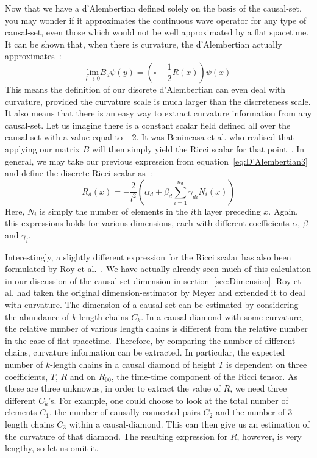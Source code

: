 \documentclass[a4paper,12pt]{article}
\numberwithin{equation}{section}
\begin{document}
Now that we have a d'Alembertian defined solely on the basis of the causal-set, you may wonder if it approximates the continuous wave operator for any type of causal-set, even those which would not be well approximated by a flat spacetime. It can be shown that, when there is curvature, the d'Alembertian actually approximates~\cite{Benincasa2010}:
\begin{equation}
\label{eq:Ricci scalar}
\underset{l\rightarrow 0}{\text{lim}} B_{d} \psi(y)=\left( \square-\frac{1}{2}R(x)\right) \psi(x)
\end{equation}
This means the definition of our discrete d'Alembertian can even deal with curvature, provided the curvature scale is much larger than the discreteness scale. It also means that there is an easy way to extract curvature information from any causal-set. Let us imagine there is a constant scalar field defined all over the causal-set with a value equal to $-2$. It was Benincasa et al. who realised that applying our matrix $B$ will then simply yield the Ricci scalar for that point~\cite{Benincasa2010}. In general, we may take our previous expression from equation~\ref{eq:D'Alembertian3} and define the discrete Ricci scalar as~\cite{Dowker2013}:
\begin{equation}
\label{eq:Ricci scalar2}
R_d (x)=-\frac{2}{l^2}\left(\alpha_d +\beta_d \sum_{i=1}^{n_d} \gamma_{d i} N_i(x)\right)
\end{equation}
Here, $N_i$ is simply the number of elements in the $i$th layer preceding $x$. Again, this expressions holds for various dimensions, each with different coefficients $\alpha$, $\beta$ and $\gamma_i$.

Interestingly, a slightly different expression for the Ricci scalar has also been formulated by Roy et al.~\cite{Roy2012}.
We have actually already seen much of this calculation in our discussion of the causal-set dimension in section~\ref{sec:Dimension}. Roy et al. had taken the original dimension-estimator by Meyer and extended it to deal with curvature. The dimension of a causal-set can be estimated by considering the abundance of $k$-length chains $C_k$. In a causal diamond with some curvature, the relative number of various length chains is different from the relative number in the case of flat spacetime. Therefore, by comparing the number of different chains, curvature information can be extracted. In particular, the expected number of $k$-length chains in a causal diamond of height $T$ is dependent on three coefficients, $T$, $R$ and on $R_{00}$, the time-time component of the Ricci tensor. As these are three unknowns, in order to extract the value of $R$, we need three different $C_k$'s. For example, one could choose to look at the total number of elements $C_1$, the number of causally connected pairs $C_2$ and the number of $3$-length chains $C_3$ within a causal-diamond. This can then give us an estimation of the curvature of that diamond. The resulting expression for $R$, however, is very lengthy, so let us omit it.
\end{document}
